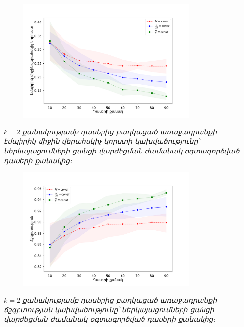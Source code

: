 \documentclass[10pt]{beamer}
\begin{document}
\begin{frame}
\begin{figure}[htp]
\centering
\includegraphics[width=0.8\textwidth]{imgs/k=2.pdf}
\end{figure}
\begin{center}
 \fontsize{7pt}{7pt} 
\armfont \textit{$k=2$ քանակությամբ դասերից բաղկացած առաջադրանքի էմպիրիկ միջին վերահսկիչ կորստի կախվածությունը՝ ներկայացումների ցանցի վարժեցման ժամանակ  օգտագործված դասերի քանակից։}
\end{center}
\end{frame}

\begin{frame}
\begin{figure}[htp]
\centering
\includegraphics[width=0.8\textwidth]{imgs/k=2_acc.pdf}
\end{figure}
\begin{center}
 \fontsize{7pt}{7pt} 
\armfont \textit{$k=2$ քանակությամբ դասերից բաղկացած առաջադրանքի ճշգրտության կախվածությունը՝ ներկայացումների ցանցի վարժեցման ժամանակ  օգտագործված դասերի քանակից։}
\end{center}
\end{frame}
\end{document}
